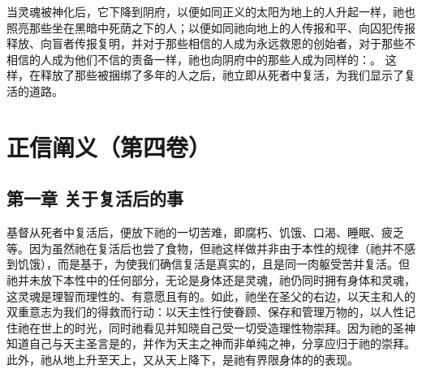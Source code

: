 当灵魂被神化后，它下降到阴府，以便如同正义的太阳为地上的人升起一样，祂也照亮那些坐在黑暗中死荫之下的人；以便如同祂向地上的人传报和平、向囚犯传报释放、向盲者传报复明，并对于那些相信的人成为永远救恩的创始者，对于那些不相信的人成为他们不信的责备一样，祂也向阴府中的那些人成为同样的：。 这样，在释放了那些被捆绑了多年的人之后，祂立即从死者中复活，为我们显示了复活的道路。\par



\section{正信阐义（第四卷）}


\subsection{第一章 关于复活后的事}

基督从死者中复活后，便放下祂的一切苦难，即腐朽、饥饿、口渴、睡眠、疲乏等。因为虽然祂在复活后也尝了食物，但祂这样做并非由于本性的规律（祂并不感到饥饿），而是基于，为使我们确信复活是真实的，且是同一肉躯受苦并复活。但祂并未放下本性中的任何部分，无论是身体还是灵魂，祂仍同时拥有身体和灵魂，这灵魂是理智而理性的、有意愿且有的。如此，祂坐在圣父的右边，以天主和人的双重意志为我们的得救而行动：以天主性行使眷顾、保存和管理万物的，以人性记住祂在世上的时光，同时祂看见并知晓自己受一切受造理性物崇拜。因为祂的圣神知道自己与天主圣言是的，并作为天主之神而非单纯之神，分享应归于祂的崇拜。此外，祂从地上升至天上，又从天上降下，是祂有界限身体的的表现。\par


